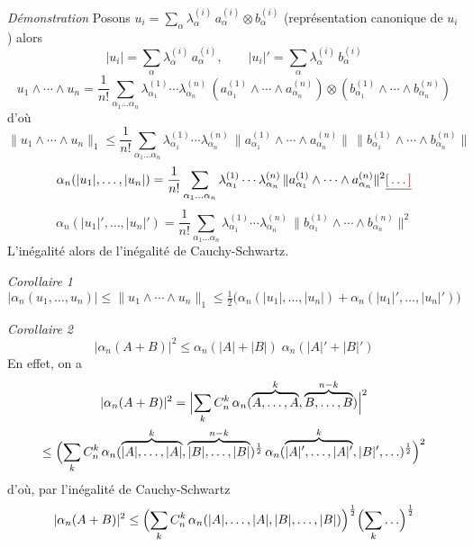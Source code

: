 \documentclass[11pt,a4paper]{article}
\begin{document}
\emph{Démonstration} Posons $u_i = \sum_\alpha \lambda^{(i)}_\alpha\, a^{(i)}_\alpha \otimes b^{(i)}_\alpha$ (représentation canonique de $u_i$) alors
\[
  |u_i| = \sum_\alpha \lambda^{(i)}_\alpha\, a^{(i)}_\alpha, \qquad |u_i|' = \sum_\alpha \lambda^{(i)}_\alpha\, b^{(i)}_\alpha
\]
\[
  u_1 \wedge \cdots \wedge u_n = \frac{1}{n!} \sum_{\alpha_1 \ldots \alpha_n} \lambda^{(1)}_{\alpha_1} \cdots \lambda^{(n)}_{\alpha_n}\, (a^{(1)}_{\alpha_1} \wedge \cdots \wedge a^{(n)}_{\alpha_n}) \otimes (b^{(1)}_{\alpha_1} \wedge \cdots \wedge b^{(n)}_{\alpha_n})
\]
d'où
\[
  \|u_1 \wedge \cdots \wedge u_n\|_1 \leq \frac{1}{n!} \sum_{\alpha_1 \ldots \alpha_n} \lambda^{(1)}_{\alpha_1} \cdots \lambda^{(n)}_{\alpha_n}\, \|a^{(1)}_{\alpha_1} \wedge \cdots \wedge a^{(n)}_{\alpha_n}\|\, \|b^{(1)}_{\alpha_1} \wedge \cdots \wedge b^{(n)}_{\alpha_n}\|
\]
  \ill{} 
\[
  \alpha_n(|u_1|, \ldots, |u_n|) = \frac{1}{n!} \sum_{\alpha_1 \ldots \alpha_n} \lambda^{(1)}_{\alpha_1} \cdots \lambda^{(n)}_{\alpha_n}\, \|a^{(1)}_{\alpha_1} \wedge \cdots \wedge a^{(n)}_{\alpha_n}\|^2 \struck{\ill{}}
\]
\[
  \alpha_n(|u_1|', \ldots, |u_n|') = \frac{1}{n!} \sum_{\alpha_1 \ldots \alpha_n} \lambda^{(1)}_{\alpha_1} \cdots \lambda^{(n)}_{\alpha_n}\, \|b^{(1)}_{\alpha_1} \wedge \cdots \wedge b^{(n)}_{\alpha_n}\|^2
\]
L'inégalité  \struck{\ill{}}  alors  de l'inégalité \struck{\ill{}} de Cauchy-Schwartz. 

\emph{Corollaire 1} 
\[
  |\alpha_n(u_1, \ldots, u_n)| \leq \|u_1 \wedge \cdots \wedge u_n\|_1 \leq \tfrac12\bigl(\alpha_n(|u_1|, \ldots, |u_n|) + \alpha_n(|u_1|', \ldots, |u_n|')\bigr)
\]

\emph{Corollaire 2} 
\[
  |\alpha_n(A+B)|^2 \leq \alpha_n(|A| + |B|)\; \alpha_n(|A|' + |B|')
\]
En effet, on a \struck{\ill{}}
\begin{gather*}
  |\alpha_n(A+B)|^2 = \Bigl|\sum_k C_n^k\, \alpha_n(\overbrace{A, \ldots, A}^{k}, \overbrace{B, \ldots, B}^{n-k})\Bigr|^2 \\
  \leq \Bigl(\sum_k C_n^k\, \alpha_n(\overbrace{|A|, \ldots, |A|}^{k}, \overbrace{|B|, \ldots, |B|}^{n-k})^{\frac12}\, \alpha_n(\overbrace{|A|', \ldots, |A|'}^{k}, |B|', \ldots)^{\frac12}\Bigr)^2
\end{gather*}
 d'où, par l'inégalité de Cauchy-Schwartz
\[
  |\alpha_n(A+B)|^2 \leq \Bigl(\sum_k C_n^k\, \alpha_n(|A|, \ldots, |A|, |B|, \ldots, |B|)\Bigr)^{\frac12} \Bigl(\sum_k \ldots\Bigr)^{\frac12}
\]
\end{document}
